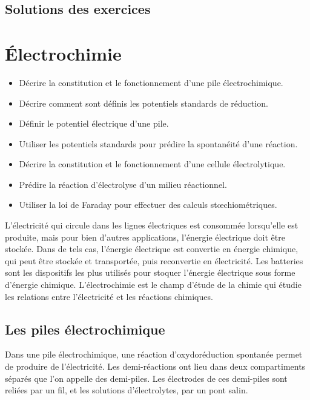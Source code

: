 \documentclass[
  11pt,
  a4paper,
  openany]{book}
\providecommand{\tightlist}{%
  \setlength{\itemsep}{0pt}\setlength{\parskip}{0pt}}
\begin{document}
\newpage

\section{Solutions des exercices} \shipoutAnswer

\chapter{Électrochimie}\label{uxe9lectrochimie}

\begin{objectives}

\begin{itemize}
\tightlist
\item
  Décrire la constitution et le fonctionnement d'une pile électrochimique.
\item
  Décrire comment sont définis les potentiels standards de réduction.
\item
  Définir le potentiel électrique d'une pile.
\item
  Utiliser les potentiels standards pour prédire la spontanéité d'une réaction.
\item
  Décrire la constitution et le fonctionnement d'une cellule électrolytique.
\item
  Prédire la réaction d'électrolyse d'un milieu réactionnel.
\item
  Utiliser la loi de Faraday pour effectuer des calculs stœchiométriques.
\end{itemize}

\end{objectives}

L'électricité qui circule dans les lignes électriques est consommée lorsqu'elle est produite, mais pour bien d'autres applications, l'énergie électrique doit être stockée. Dans de tels cas, l'énergie électrique est convertie en énergie chimique, qui peut être stockée et transportée, puis reconvertie en électricité. Les batteries sont les dispositifs les plus utilisés pour stoquer l'énergie électrique sous forme d'énergie chimique. L'électrochimie est le champ d'étude de la chimie qui étudie les relations entre l'électricité et les réactions chimiques.

\section{Les piles électrochimique}\label{les-piles-uxe9lectrochimique}

Dans une pile électrochimique, une réaction d'oxydoréduction spontanée permet de produire de l'électricité. Les demi-réactions ont lieu dans deux compartiments séparés que l'on appelle des demi-piles. Les électrodes de ces demi-piles sont reliées par un fil, et les solutions d'électrolytes, par un pont salin.
\end{document}
